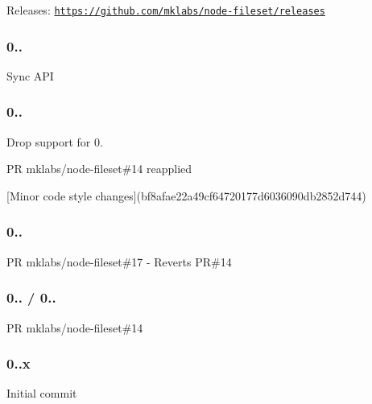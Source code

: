 
\begin{DoxyItemize}
\item Releases\+: \href{https://github.com/mklabs/node-fileset/releases}{\tt https\+://github.\+com/mklabs/node-\/fileset/releases}
\end{DoxyItemize}

\subsubsection*{0..}


\begin{DoxyItemize}
\item Sync A\+P\+I
\end{DoxyItemize}

\subsubsection*{0..}


\begin{DoxyItemize}
\item Drop support for 0.
\item P\+R mklabs/node-\/fileset\#14 reapplied
\item \mbox{[}Minor code style changes\mbox{]}(bf8afae22a49cf64720177d6036090db2852d744)
\end{DoxyItemize}

\subsubsection*{0..}


\begin{DoxyItemize}
\item P\+R mklabs/node-\/fileset\#17 -\/ Reverts P\+R\#14
\end{DoxyItemize}

\subsubsection*{0.. / 0..}


\begin{DoxyItemize}
\item P\+R mklabs/node-\/fileset\#14
\end{DoxyItemize}

\subsubsection*{0..\+x}


\begin{DoxyItemize}
\item Initial commit 
\end{DoxyItemize}
